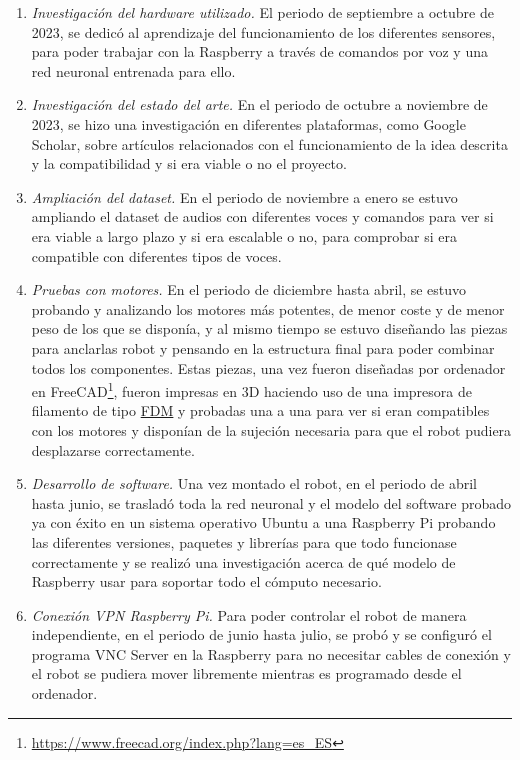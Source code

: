 \begin{enumerate}
 \item \textit{Investigación del hardware utilizado.} El periodo de septiembre a octubre de 2023, se dedicó al aprendizaje del funcionamiento de los diferentes sensores, para poder trabajar con la Raspberry a través de comandos por voz y una red neuronal entrenada para ello.

 \item \textit{Investigación del estado del arte.} En el periodo de octubre a noviembre de 2023, se hizo una investigación en diferentes plataformas, como Google Scholar, sobre artículos relacionados con el funcionamiento de la idea descrita y la compatibilidad y si era viable o no el proyecto.
 
  \item \textit{Ampliación del dataset.} En el periodo de noviembre a enero se estuvo ampliando el dataset de audios con diferentes voces y comandos para ver si era viable a largo plazo y si era escalable o no, para comprobar si era compatible con diferentes tipos de voces.
  
  \item \textit{Pruebas con motores.} En el periodo de diciembre hasta abril, se estuvo probando y analizando los motores más potentes, de menor coste y de menor peso de los que se disponía, y al mismo tiempo se estuvo diseñando las piezas para anclarlas robot y pensando en la estructura final para poder combinar todos los componentes. Estas piezas, una vez fueron diseñadas por ordenador en FreeCAD\footnote{\url{https://www.freecad.org/index.php?lang=es_ES}}, fueron impresas en 3D haciendo uso de una impresora de filamento de tipo \hyperlink{FDM}{FDM} y probadas una a una para ver si eran compatibles con los motores y disponían de la sujeción necesaria para que el robot pudiera desplazarse correctamente.
  
 \item \textit{Desarrollo de software.} Una vez montado el robot, en el periodo de abril hasta junio, se trasladó toda la red neuronal y el modelo del software probado ya con éxito en un sistema operativo Ubuntu a una Raspberry Pi probando las diferentes versiones, paquetes y librerías para que todo funcionase correctamente y se realizó una investigación acerca de qué modelo de Raspberry usar para soportar todo el cómputo necesario.
 
  \item \textit{Conexión VPN Raspberry Pi.} Para poder controlar el robot de manera independiente, en el periodo de junio hasta julio, se probó y se configuró el programa VNC Server en la Raspberry para no necesitar cables de conexión y el robot se pudiera mover libremente mientras es programado desde el ordenador.
  

\end{enumerate}
